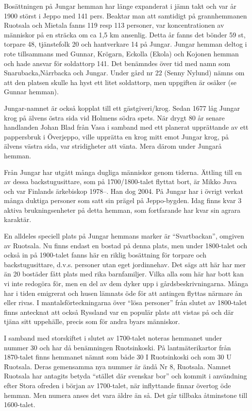Bosättningen på Jungar hemman har länge expanderat i jämn takt och var år 1900 störst i Jeppo med 141 pers. Beaktar man att samtidigt på grannhemmanen Ruotsala och Mietala fanns 119 resp 113 personer, var koncentrationen av människor på en sträcka om ca 1,5 km ansenlig. Detta år fanns det bönder 59 st, torpare 48, tjänstefolk 20 och hantverkare 14 på Jungar. Jungar hemman deltog i rote tillsammans med Gunnar, Krögarn, Eckolla (Ekola) och Kojonen hemman och hade ansvar för soldattorp 141. Det benämndes över tid med namn som Snarubacka,Nårrbacka och Jungar. Under gård nr 22 (Senny Nylund) nämns om att den platsen skulle ha hyst ett litet soldattorp, men uppgiften är osäker (se Gunnar hemman).

Jungar-namnet är också kopplat till ett gästgiveri/krog. Sedan 1677 låg Jungar krog på älvens östra sida vid Holmens södra spets. När  drygt 80 år senare handlanden Johan Blad från Vasa i samband med ett planerat upprättande av ett pappersbruk i Överjeppo, ville upprätta en krog mitt emot Jungar krog,  på älvens västra sida, var stridigheter att vänta. Mera därom under Jungarå hemman.

Från Jungar har utgått många dugliga människor genom tiderna. Ättling till en av dessa backstugusittare, som på 1700/1800-talet flyttat bort, är Mikko Juva och var Finlands ärkebiskop 1978--. Han dog 2004. På Jungar har i övrigt verkat många duktiga personer som satt sin prägel på Jeppo-bygden. Idag finns kvar 3 aktiva brukningsenheter på detta hemman, som fortfarande har kvar sin agrara karaktär.

En alldeles speciell plats på Jungar hemmans marker är ``Svartbackan'', omgiven av Ruotsala. Nu finns endast en bostad på denna plats, men under 1800-talet och också in på 1900-talet fanns här en riklig bosättning för torpare och backstugusittare, d.v.s. personer utan eget jordinnehav. Det sägs att här har mer än 20 bostäder fått plats med rika barnfamiljer. Vilka alla som här har bott kan vi inte redogöra för, men en del av dem dyker upp i gårdsbeskrivningarna. Många har i tiden emigrerat och husen lämnats öde för att antingen flyttas närmare ån eller rivas. I mantalsförteckningarna över ``lösa personer'' från slutet av 1800-talet finns antecknat att också Ryssland var en populär plats att vistas på och där tjäna sitt uppehälle, precis som för andra byars människor.



I samband med storskiftet i slutet av 1700-talet noteras hemmanet under nummer 30 och har då benämningen Ruotsinkoski. På lantmäterikartor från 1870-talet finns hemmanet nämnt som både 30 I \= Ruotsinkoski och som 30 U \= Ruotsala. Deras gemensamma nya nummer är ändå Nr 8, Ruotsala. Namnet Ruotsala har antagits betyda ``stället där svenskar bor'' och kommit i användning efter Stora ofreden i början av 1700-talet, när inflyttande finnar övertog öde hemman. Men numera anses det vara äldre än så. Det går tillbaka åtminstone till 1600-talet.


